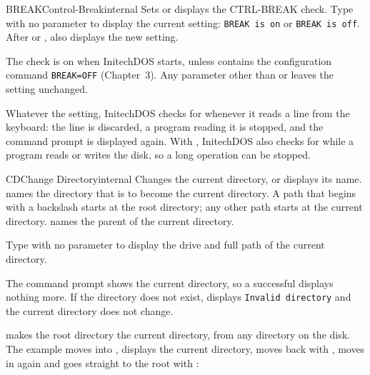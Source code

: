 \begin{DosEntry}{BREAK}{Control-Break}{internal}
\Purpose Sets or displays the CTRL-BREAK check.
\Format {}
\Remarks
Type  with no parameter to display the current setting:
\texttt{BREAK is on} or \texttt{BREAK is off}.  After  or ,
 also displays the new setting.

The check is on when InitechDOS starts, unless  contains
the configuration command \texttt{BREAK=OFF} (Chapter~3).  Any parameter
other than  or  leaves the setting unchanged.

Whatever the setting, InitechDOS checks for  whenever it reads
a line from the keyboard: the line is discarded, a program reading it is
stopped, and the command prompt is displayed again.
With , InitechDOS also checks for  while a program reads
or writes the disk, so a long operation can be stopped.
\Example
{}
\end{DosEntry}

\begin{DosEntry}{CD}{Change Directory}{internal}
\Purpose Changes the current directory, or displays its name.
\Format {}
\Remarks
{} names the directory that is to become the current directory.
A path that begins with a backslash starts at the root directory; any other
path starts at the current directory.   names the parent of the
current directory.

Type  with no parameter to display the drive and full path of the
current directory.

The command prompt shows the current directory, so a successful 
displays nothing more.  If the directory does not exist,  displays
\texttt{Invalid directory} and the current directory does not change.

 makes the root directory the current directory, from any
directory on the disk.
\Example
The example moves into , displays the current directory,
moves back with , moves in again and goes straight to the root
with :
\end{DosEntry}

